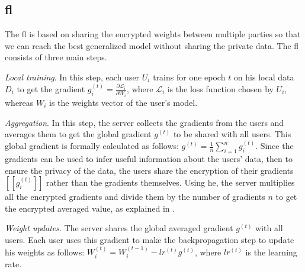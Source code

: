 \subsection{\acf{fl}}
\label{sec:preliminaries-fl}
The \ac{fl} is based on sharing the encrypted weights between multiple parties so that we can reach the best generalized model without sharing the private data.
The \ac{fl} consists of three main steps.
\begin{enumerate*}[label=(\roman*)]
\item \emph{Local training}.
In this step, each user $U_i$ trains for one epoch $t$ on his local data $D_i$ to get the gradient $g_i^{(t)} = \frac{\partial \mathcal{L}_i}{\partial W_i}$, where $\mathcal{L}_i$ is the loss function chosen by $U_i$, whereas $W_i$ is the weights vector of the user's model.
\item \emph{Aggregation}.
In this step, the server collects the gradients from the users and averages them to get the global gradient $g^{(t)}$ to be shared with all users.
This global gradient is formally calculated as follows: $g^{(t)} = \frac{1}{n} \sum_{i=1}^n g_i^{(t)}$.
Since the gradients can be used to infer useful information about the users' data, then to ensure the privacy of the data, the users share the encryption of their gradients $[[g_i^{(t)}]]$ rather than the gradients themselves.
Using \ac{he}, the server multiplies all the encrypted gradients and divide them by the number of gradients $n$ to get the encrypted averaged value, as explained in .
\item \emph{Weight updates}.
The server shares the global averaged gradient $g^(t)$ with all users.
Each user uses this gradient to make the backpropagation step to update his weights as follows: $W_i^{(t)} = W_i^{(t-1)} - lr^{(t)} g^{(t)}$, where $lr^{(t)}$ is the learning rate.
\end{enumerate*}
